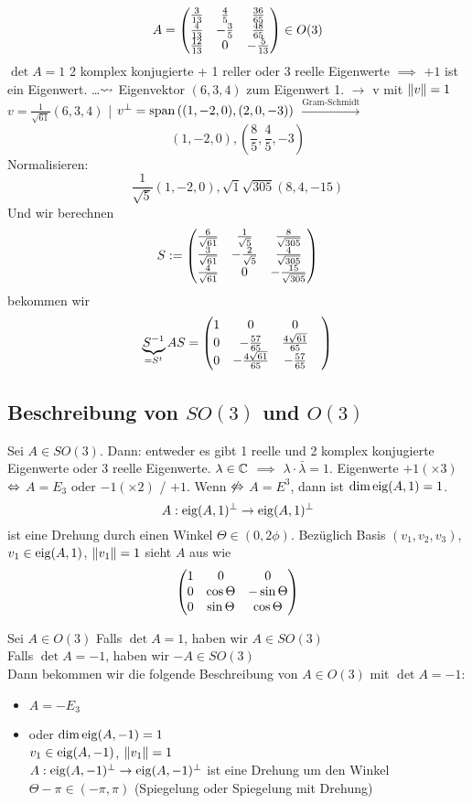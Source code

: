 \begin{Bsp}
  \[A=\begin{pmatrix}\frac{3}{13}& \frac{4}{5}&\frac{36}{65}\\\frac{4}{13}&-\frac{3}{5}&\frac{48}{65}\\\frac{12}{13}&0&-\frac{5}{13}\end{pmatrix}\in O(3)\]
  $\det A=1$ 2 komplex konjugierte + 1 reller oder 3 reelle Eigenwerte $\implies$ $+1$ ist ein Eigenwert. \ldots $\rightsquigarrow$ Eigenvektor $(6,3,4)$ zum Eigenwert 1. $\to$ v mit $\left\| v \right\|=1$ $v=\frac{1}{\sqrt{61}}(6,3,4)$ | $v^\perp=\operatorname{span}\left( (1,-2,0),(2,0,-3) \right)$ $\xrightarrow{\text{Gram-Schmidt}}$ \[(1,-2,0),(\frac{8}{5},\frac{4}{5},-3)\] Normalisieren:
  \[\frac{1}{\sqrt{5}}(1,-2,0), \sqrt{1}{\sqrt{305}}(8,4,-15)\]
  Und wir berechnen
  \[S:=\begin{pmatrix}\frac{6}{\sqrt{61}}&\frac{1}{\sqrt{5}}&\frac{8}{\sqrt{305}}\\\frac{3}{\sqrt{61}}&-\frac{2}{\sqrt{5}}&\frac{4}{\sqrt{305}}\\\frac{4}{\sqrt{61}}&0&-\frac{15}{\sqrt{305}}\end{pmatrix}\]
  bekommen wir 
  \[\underbrace{S^{-1}}_{=S^t}AS=\begin{pmatrix}1&0&0\\0&-\frac{57}{65}&\frac{4\sqrt{61}}{65}&\\0&-\frac{4\sqrt{61}}{65}&-\frac{57}{65}\end{pmatrix}\]
\end{Bsp}
\subsection{Beschreibung von $SO(3)$ und $O(3)$}
\begin{Eig}
  Sei $A\in SO(3)$. Dann: entweder es gibt 1 reelle und 2 komplex konjugierte Eigenwerte oder 3 reelle Eigenwerte. $\lambda\in \mathbb{C}$ $\implies$ $\lambda\cdot\bar\lambda=1$. Eigenwerte $+1 (\times 3)$ $\Leftrightarrow$ $A=E_3$ oder $-1(\times 2)$ / $+1$. Wenn $\not\Leftrightarrow$ $A=E^3$, dann ist $\dim\operatorname{eig}(A,1)=1$.\\
  \[A:\operatorname{eig}(A,1)^\perp \to\operatorname{eig} (A,1)^\perp\]
  ist eine Drehung durch einen Winkel $\Theta\in (0,2\phi)$. Bezüglich Basis $(v_1,v_2,v_3)$, $v_1\in\operatorname{eig}(A,1)$, $\left\| v_1 \right\|=1$ sieht $A$ aus wie
  \[\begin{pmatrix}1&0&0\\0&\cos\Theta&-\sin\Theta\\0&\sin\Theta&\cos\Theta\end{pmatrix}\]
\end{Eig}
\begin{Eig}
  Sei $A\in O(3)$
  Falls $\det A=1$, haben wir $A\in SO(3)$\\
  Falls $\det A=-1$, haben wir $-A\in SO(3)$\\
  Dann bekommen wir die folgende Beschreibung von $A\in O(3)$ mit $\det A=-1$:
  \begin{itemize}
    \item $A=-E_3$
    \item oder $\dim \operatorname{eig}(A,-1)=1$\\
      $v_1\in\operatorname{eig}(A,-1)$, $\left\| v_1 \right\|=1$\\
      $A:\operatorname{eig}(A,-1)^\perp\to\operatorname{eig}(A,-1)^\perp$ ist eine Drehung um den Winkel $\Theta-\pi\in(-\pi,\pi)$ (Spiegelung oder Spiegelung mit Drehung)
  \end{itemize}
\end{Eig}
